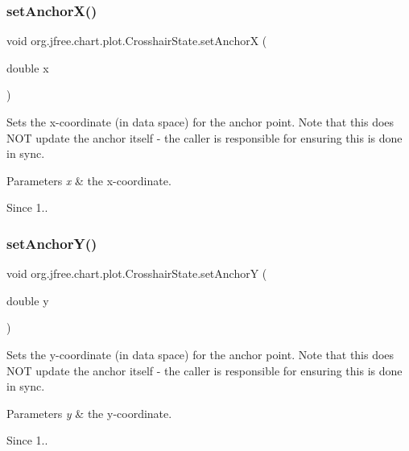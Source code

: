 \subsubsection{\texorpdfstring{set\+Anchor\+X()}{setAnchorX()}}
{\footnotesize\ttfamily void org.\+jfree.\+chart.\+plot.\+Crosshair\+State.\+set\+AnchorX (\begin{DoxyParamCaption}\item[{double}]{x }\end{DoxyParamCaption})}

Sets the x-\/coordinate (in data space) for the anchor point. Note that this does N\+OT update the anchor itself -\/ the caller is responsible for ensuring this is done in sync.


\begin{DoxyParams}{Parameters}
{\em x} & the x-\/coordinate.\\
\hline
\end{DoxyParams}
\begin{DoxySince}{Since}
1.. 
\end{DoxySince}
\mbox{\label{classorg_1_1jfree_1_1chart_1_1plot_1_1_crosshair_state_ad5c771ad757ee61d02c394a0f74f8071}} 
\subsubsection{\texorpdfstring{set\+Anchor\+Y()}{setAnchorY()}}
{\footnotesize\ttfamily void org.\+jfree.\+chart.\+plot.\+Crosshair\+State.\+set\+AnchorY (\begin{DoxyParamCaption}\item[{double}]{y }\end{DoxyParamCaption})}

Sets the y-\/coordinate (in data space) for the anchor point. Note that this does N\+OT update the anchor itself -\/ the caller is responsible for ensuring this is done in sync.


\begin{DoxyParams}{Parameters}
{\em y} & the y-\/coordinate.\\
\hline
\end{DoxyParams}
\begin{DoxySince}{Since}
1.. 
\end{DoxySince}
\mbox{\label{classorg_1_1jfree_1_1chart_1_1plot_1_1_crosshair_state_aea6b9ca1f8b09694339619bf4e3dee87}} 
